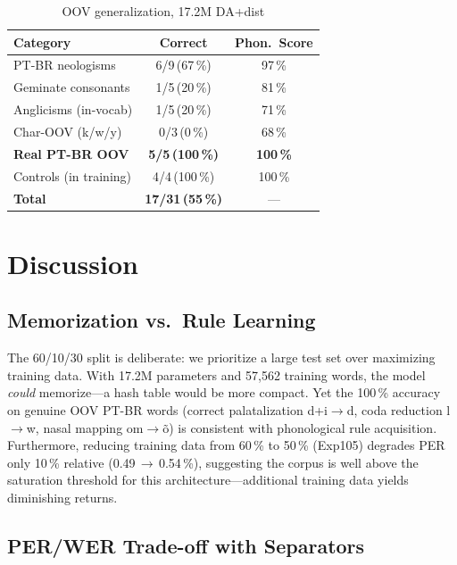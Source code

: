 \documentclass[conference]{IEEEtran}
\begin{document}
\begin{table}[t]
  \caption{OOV generalization, 17.2M DA+dist}
  \label{tab:oov}
  \centering\small
  \begin{tabular}{lcc}
    \toprule
    Category & Correct & Phon.\ Score \\
    \midrule
    PT-BR neologisms        & 6/9\,(67\,\%)   & 97\,\% \\
    Geminate consonants     & 1/5\,(20\,\%)   & 81\,\% \\
    Anglicisms (in-vocab)   & 1/5\,(20\,\%)   & 71\,\% \\
    Char-OOV (k/w/y)        & 0/3\,(0\,\%)    & 68\,\% \\
    \textbf{Real PT-BR OOV} & \textbf{5/5\,(100\,\%)} & \textbf{100\,\%} \\
    Controls (in training)  & 4/4\,(100\,\%)  & 100\,\% \\
    \midrule
    \textbf{Total}          & \textbf{17/31\,(55\,\%)} & --- \\
    \bottomrule
  \end{tabular}
\end{table}

\section{Discussion}
\label{sec:discussion}

\subsection{Memorization vs.\ Rule Learning}

The 60/10/30 split is deliberate: we prioritize a large test set
over maximizing training data.
With 17.2M parameters and 57{,}562 training words, the model
\emph{could} memorize---a hash table would be more compact.
Yet the 100\,\% accuracy on genuine OOV PT-BR words (correct
palatalization d+i$\to$d, coda reduction l$\to$w,
nasal mapping om$\to$\~{o}) is consistent with phonological rule
acquisition.
Furthermore, reducing training data from 60\,\% to 50\,\% (Exp105)
degrades PER only 10\,\% relative (0.49\,$\to$\,0.54\,\%),
suggesting the corpus is well above the saturation threshold for
this architecture---additional training data yields diminishing
returns.

\subsection{PER/WER Trade-off with Separators}
\end{document}

